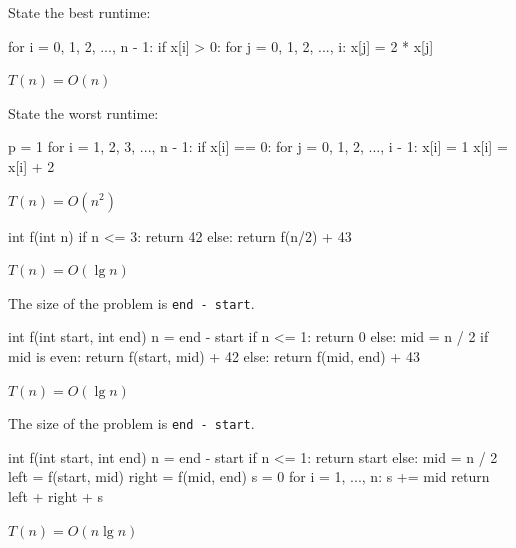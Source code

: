 \nextq
State the best runtime:
\begin{console}[fontsize=\small]
for i = 0, 1, 2, ..., n - 1:
    if x[i] > 0:
        for j = 0, 1, 2, ..., i:
            x[j] = 2 * x[j]
\end{console}
\ANSWER
\begin{answerlong}
$T(n) = O(n)$
\end{answerlong}

\nextq
State the worst runtime:
\begin{console}[fontsize=\small]
p = 1
for i = 1, 2, 3, ..., n - 1:
    if x[i] == 0:
        for j = 0, 1, 2, ..., i - 1:
            x[i] = 1
    x[i] = x[i] + 2
\end{console}
\ANSWER
\begin{answerlong}
$T(n) = O(n^2)$
\end{answerlong}

\nextq
\begin{console}[fontsize=\small]
int f(int n)
{
    if n <= 3:
        return 42
    else:
        return f(n/2) + 43
}
\end{console}
\ANSWER
\begin{answerlong}
$T(n) = O(\lg n)$
\end{answerlong}

\nextq
The size of the problem is \verb!end - start!.
\begin{console}[fontsize=\small]
int f(int start, int end)
{
    n = end - start
    if n <= 1:
        return 0
    else:
        mid = n / 2
        if mid is even:
            return f(start, mid) + 42
        else:
            return f(mid, end) + 43
}
\end{console}
\ANSWER
\begin{answerlong}
$T(n) = O(\lg n)$
\end{answerlong}

\nextq
The size of the problem is \verb!end - start!.
\begin{console}[fontsize=\small]
int f(int start, int end)
{
    n = end - start
    if n <= 1:
        return start %
    else:
        mid = n / 2
        left = f(start, mid)
        right = f(mid, end)
        s = 0
        for i = 1, ..., n:
            s += mid
        return left + right + s
}
\end{console}
\ANSWER
\begin{answerlong}
$T(n) = O(n \lg n)$
\end{answerlong}


